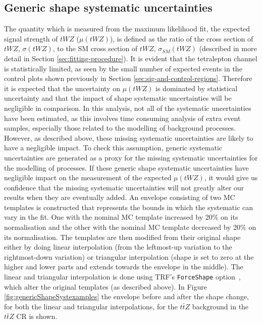 \subsection{Generic shape systematic uncertainties}
\label{sec:genericShapeSyst}

The quantity which is measured from the maximum likelihood fit, the expected signal strength of $tWZ$ ($\mu (tWZ)$), is defined as the ratio of the cross section of $tWZ$, $\sigma(tWZ)$, to the SM cross section of $tWZ$, $\sigma_{SM}(tWZ)$ (described in more detail in Section \ref{sec:fitting-procedure}). It is evident that the tetralepton channel is statistically limited, as seen by the small number of expected events in the control plots shown previously in Section \ref{sec:sig-and-control-regions}. Therefore it is expected that the uncertainty on $\mu(tWZ)$ is dominated by statistical uncertainty and that the impact of shape systematic uncertainties will be negligible in comparison. In this analysis, not all of the systematic uncertainties have been estimated, as this involves time consuming analysis of extra event samples, especially those related to the modelling of background processes. However, as described above, these missing systematic uncertainties are likely to have a negligible impact. To check this assumption, generic systematic uncertainties are generated as a proxy for the missing systematic uncertainties for the modelling of processes. If these generic shape systematic uncertainties have negligible impact on the measurement of the expected $\mu (tWZ)$, it would give us confidence that the missing systematic uncertainties will not greatly alter our results when they are eventually added. An envelope consisting of two MC templates is constructed that represents the bounds in which the systematic can vary in the fit. One with the nominal MC template increased by 20$\%$ on its normalisation and the other with the nominal MC template decreased by 20$\%$ on its normalisation. The templates are then modified from their original shape either by doing linear interpolation (from the leftmost-up variation to the rightmost-down variation) or triangular interpolation (shape is set to zero at the higher and lower parts and extends towards the envelope in the middle). The linear and triangular interpolation is done using TRF's \texttt{ForceShape} option~\cite{TRexfitter}, which alter the original templates (as described above). In Figure \ref{fig:genericShapeSystexamples} the envelope before and after the shape change, for both the linear and triangular interpolations, for the $t\bar{t}Z$ background in the $t\bar{t}Z$ CR is shown.

